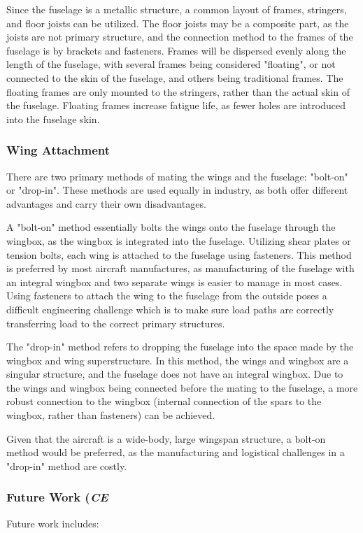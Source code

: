 Since the fuselage is a metallic structure, a common layout of frames, stringers, and floor joists can be utilized. The floor joists may be a composite part, as the joists are not primary structure, and the connection method to the frames of the fuselage is by brackets and fasteners. Frames will be dispersed evenly along the length of the fuselage, with several frames being considered "floating", or not connected to the skin of the fuselage, and others being traditional frames. The floating frames are only mounted to the stringers, rather than the actual skin of the fuselage. Floating frames increase fatigue life, as fewer holes are introduced into the fuselage skin.

\subsubsection{Wing Attachment}
There are two primary methods of mating the wings and the fuselage: "bolt-on" or "drop-in". These methods are used equally in industry, as both offer different advantages and carry their own disadvantages. 

A "bolt-on" method essentially bolts the wings onto the fuselage through the wingbox, as the wingbox is integrated into the fuselage. Utilizing shear plates or tension bolts, each wing is attached to the fuselage using fasteners. This method is preferred by most aircraft manufactures, as manufacturing of the fuselage with an integral wingbox and two separate wings is easier to manage in most cases. Using fasteners to attach the wing to the fuselage from the outside poses a difficult engineering challenge which is to make sure load paths are correctly transferring load to the correct primary structures.

The "drop-in" method refers to dropping the fuselage into the space made by the wingbox and wing superstructure. In this method, the wings and wingbox are a singular structure, and the fuselage does not have an integral wingbox. Due to the wings and wingbox being connected before the mating to the fuselage, a more robust connection to the wingbox (internal connection of the spars to the wingbox, rather than fasteners) can be achieved. 

Given that the aircraft is a wide-body, large wingspan structure, a bolt-on method would be preferred, as the manufacturing and logistical challenges in a "drop-in" method are costly.

\subsubsection{Future Work (\textit{CE}}
Future work includes: 

